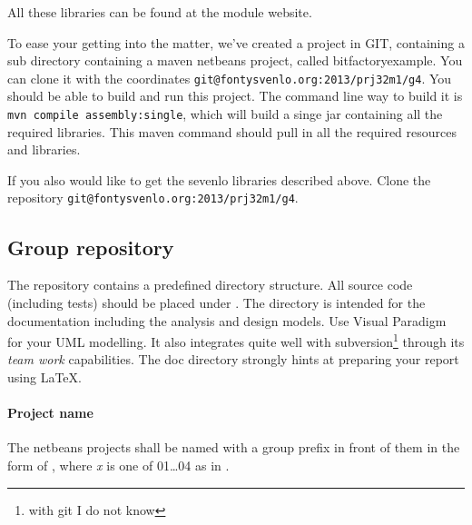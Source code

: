 All these libraries can be found at the module website.

To ease your getting into the matter, we've created a project in GIT,
containing a sub directory containing a maven netbeans project, called
bitfactoryexample. You can clone it with the coordinates
\texttt{git@fontysvenlo.org:2013/prj32m1/g4}. You should be able to
  build and run this project. The command line way to build it is
\texttt{mvn compile assembly:single}, which will build a singe jar
containing all the required libraries. This maven command should pull
in all the required resources and libraries.

If you also would like to get the sevenlo libraries described
above. Clone the repository \texttt{git@fontysvenlo.org:2013/prj32m1/g4}.



\subsection{Group repository}
The
repository contains a predefined directory structure. All source 
code (including tests) should be placed under . The 
directory is intended for the documentation including the analysis and
design models. Use Visual Paradigm for your UML modelling. It also
integrates quite well with subversion\footnote{with git I do not know} through its \textit{team work}
capabilities. The doc directory strongly hints at preparing your
report using \LaTeX.

\paragraph{Project name} The netbeans projects shall be named with a
group prefix in front of them in the form of , where \textit{x} is
one of 01\ldots04  as in .

